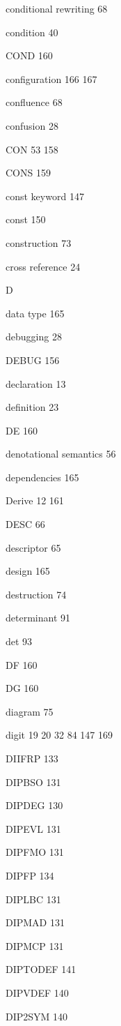 \item conditional rewriting 68
\item condition 40
\item COND 160
\item configuration  166 167
\item confluence 68
\item confusion 28
\item CON  53 158
\item CONS 159
\item const keyword 147
\item const 150
\item construction 73
\item cross reference 24
\indexspace
\item {\Large D}
\item data type 165
\item debugging 28
\item DEBUG 156
\item declaration 13
\item definition 23
\item DE 160
\item denotational semantics 56
\item dependencies 165
\item Derive  12 161
\item DESC 66
\item descriptor 65
\item design  165
\item destruction 74
\item determinant 91
\item det 93
\item DF 160
\item DG 160
\item diagram 75
\item digit  19 20 32 84  147 169
\item DIIFRP 133
\item DIPBSO 131
\item DIPDEG 130
\item DIPEVL 131
\item DIPFMO 131
\item DIPFP 134
\item DIPLBC 131
\item DIPMAD 131
\item DIPMCP 131
\item DIPTODEF 141
\item DIPVDEF 140
\item DIP2SYM 140
